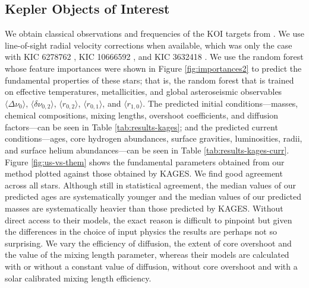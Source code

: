 \documentclass[twocolumn,twocolappendix]{aastex6}
\begin{document}
\subsection{Kepler Objects of Interest}
We obtain classical observations and frequencies of the KOI targets from \citet[hereinafter KAGES]{2015MNRAS.452.2127S}. We use line-of-sight radial velocity corrections when available, which was only the case with KIC 6278762 \citep{2002AJ....124.1144L}, KIC 10666592 \citep{2013A&A...554A..84M}, and KIC 3632418 \citep{2006AstL...32..759G}. We use the random forest whose feature importances were shown in Figure \ref{fig:importances2} to predict the fundamental properties of these stars; that is, the random forest that is trained on effective temperatures, metallicities, and global asteroseismic observables $\langle \Delta\nu_0 \rangle$, $\langle \delta\nu_{0,2} \rangle$, $\langle r_{0,2} \rangle$, $\langle r_{0,1} \rangle$, and $\langle r_{1,0} \rangle$. The predicted initial conditions---masses, chemical compositions, mixing lengths, overshoot coefficients, and diffusion factors---can be seen in Table \ref{tab:results-kages}; and the predicted current conditions---ages, core hydrogen abundances, surface gravities, luminosities, radii, and surface helium abundances---can be seen in Table \ref{tab:results-kages-curr}. Figure \ref{fig:us-vs-them} shows the fundamental parameters obtained from our method plotted against those obtained by KAGES. We find good agreement across all stars. Although still in statistical agreement, the median values of our predicted ages are systematically younger and the median values of our predicted masses are systematically heavier than those predicted by KAGES. 
 Without direct access to their models, the exact reason is difficult to pinpoint but given the differences in the choice of input physics the results are perhaps not so surprising. 
We vary the efficiency of diffusion, the extent of core overshoot and the value of the mixing length parameter, whereas their models are calculated with or without a constant value of diffusion, without core overshoot and with a solar calibrated mixing length efficiency.   
\end{document}
